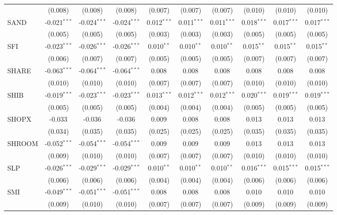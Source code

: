 \begin{table}[!htbp]
\begin{tabular}{@{\extracolsep{5pt}}lccccccccc}
  & (0.008) & (0.008) & (0.008) & (0.007) & (0.007) & (0.007) & (0.010) & (0.010) & (0.010) \\
 SAND & -0.021$^{***}$ & -0.024$^{***}$ & -0.024$^{***}$ & 0.012$^{***}$ & 0.011$^{***}$ & 0.011$^{***}$ & 0.018$^{***}$ & 0.017$^{***}$ & 0.017$^{***}$ \\
  & (0.005) & (0.005) & (0.005) & (0.003) & (0.003) & (0.003) & (0.005) & (0.005) & (0.005) \\
 SFI & -0.023$^{***}$ & -0.026$^{***}$ & -0.026$^{***}$ & 0.010$^{**}$ & 0.010$^{**}$ & 0.010$^{**}$ & 0.015$^{**}$ & 0.015$^{**}$ & 0.015$^{**}$ \\
  & (0.006) & (0.007) & (0.007) & (0.005) & (0.005) & (0.005) & (0.007) & (0.007) & (0.007) \\
 SHARE & -0.063$^{***}$ & -0.064$^{***}$ & -0.064$^{***}$ & 0.008$^{}$ & 0.008$^{}$ & 0.008$^{}$ & 0.008$^{}$ & 0.008$^{}$ & 0.008$^{}$ \\
  & (0.010) & (0.010) & (0.010) & (0.007) & (0.007) & (0.007) & (0.010) & (0.010) & (0.010) \\
 SHIB & -0.019$^{***}$ & -0.023$^{***}$ & -0.023$^{***}$ & 0.013$^{***}$ & 0.012$^{***}$ & 0.012$^{***}$ & 0.020$^{***}$ & 0.019$^{***}$ & 0.019$^{***}$ \\
  & (0.005) & (0.005) & (0.005) & (0.004) & (0.004) & (0.004) & (0.005) & (0.005) & (0.005) \\
 SHOPX & -0.033$^{}$ & -0.036$^{}$ & -0.036$^{}$ & 0.009$^{}$ & 0.008$^{}$ & 0.008$^{}$ & 0.013$^{}$ & 0.013$^{}$ & 0.013$^{}$ \\
  & (0.034) & (0.035) & (0.035) & (0.025) & (0.025) & (0.025) & (0.035) & (0.035) & (0.035) \\
 SHROOM & -0.052$^{***}$ & -0.054$^{***}$ & -0.054$^{***}$ & 0.009$^{}$ & 0.009$^{}$ & 0.009$^{}$ & 0.013$^{}$ & 0.013$^{}$ & 0.013$^{}$ \\
  & (0.009) & (0.010) & (0.010) & (0.007) & (0.007) & (0.007) & (0.010) & (0.010) & (0.010) \\
 SLP & -0.026$^{***}$ & -0.029$^{***}$ & -0.029$^{***}$ & 0.010$^{**}$ & 0.010$^{**}$ & 0.010$^{**}$ & 0.016$^{***}$ & 0.015$^{***}$ & 0.015$^{***}$ \\
  & (0.006) & (0.006) & (0.006) & (0.004) & (0.004) & (0.004) & (0.006) & (0.006) & (0.006) \\
 SMI & -0.049$^{***}$ & -0.051$^{***}$ & -0.051$^{***}$ & 0.008$^{}$ & 0.008$^{}$ & 0.008$^{}$ & 0.010$^{}$ & 0.010$^{}$ & 0.010$^{}$ \\
  & (0.009) & (0.010) & (0.010) & (0.007) & (0.007) & (0.007) & (0.009) & (0.009) & (0.009) \\

\end{tabular}
\end{table}
